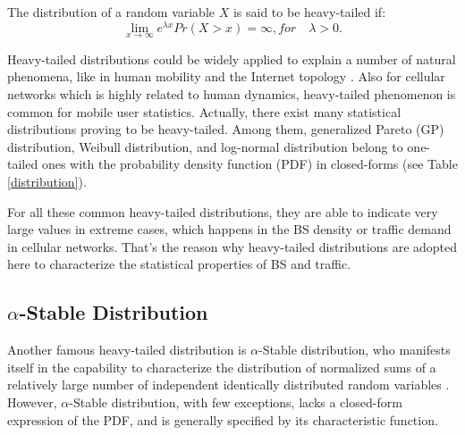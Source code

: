 \begin{definition}
The distribution of a random variable $X$ is said to be heavy-tailed if:
\begin{equation}
\lim_{x \to \infty}e^{\lambda x}Pr(X > x)=\infty,   for \quad \lambda > 0.
\end{equation}
\end{definition}

Heavy-tailed distributions could be widely applied to explain a number of natural phenomena, like in human mobility \cite{gonzalez2008understanding} and the Internet topology \cite{faloutsos1999power}. Also for cellular networks which is highly related to human dynamics, heavy-tailed phenomenon is common for mobile user statistics. Actually, there exist many statistical distributions proving to be heavy-tailed. Among them, generalized Pareto (GP) distribution, Weibull distribution, and log-normal distribution belong to one-tailed ones with the probability density function (PDF) in closed-forms (see Table \ref{distribution}).

For all these common heavy-tailed distributions, they are able to indicate very large values in extreme cases, which happens in the BS density or traffic demand in cellular networks. That's the reason why heavy-tailed distributions are adopted here to characterize the statistical properties of BS and traffic.
\subsection{$\alpha$-Stable Distribution}
Another famous heavy-tailed distribution is $\alpha$-Stable distribution, who manifests itself in the capability to characterize the distribution of normalized sums of a relatively large number of independent identically distributed random variables \cite{samorodnitsky1994stable}. However, $\alpha$-Stable distribution, with few exceptions, lacks a closed-form expression of the PDF, and is generally specified by its characteristic function.

